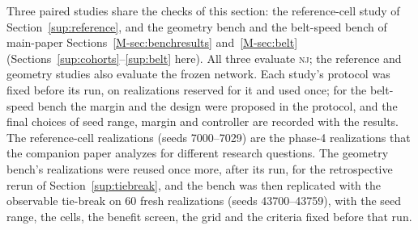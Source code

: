 \documentclass[11pt,a4paper]{article}
\newcommand{\nj}{\textsc{nj}}
\begin{document}
Three paired studies share the checks of this section: the reference-cell study of Section~\ref{sup:reference}, and the geometry bench and the belt-speed bench of main-paper Sections~\ref{M-sec:benchresults} and~\ref{M-sec:belt} (Sections~\ref{sup:cohorts}--\ref{sup:belt} here). All three evaluate \nj; the reference and geometry studies also evaluate the frozen network. Each study's protocol was fixed before its run, on realizations reserved for it and used once; for the belt-speed bench the margin and the design were proposed in the protocol, and the final choices of seed range, margin and controller are recorded with the results. The reference-cell realizations (seeds 7000--7029) are the phase-4 realizations that the companion paper analyzes for different research questions. The geometry bench's realizations were reused once more, after its run, for the retrospective rerun of Section~\ref{sup:tiebreak}, and the bench was then replicated with the observable tie-break on 60 fresh realizations (seeds 43700--43759), with the seed range, the cells, the benefit screen, the grid and the criteria fixed before that run.
\end{document}
